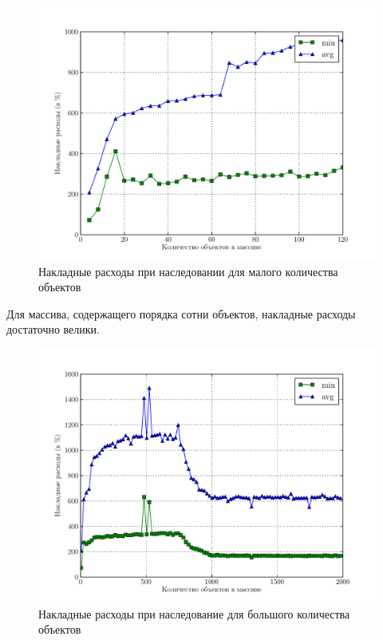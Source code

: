 \documentclass[12pt, a4paper, utf8]{article}
\begin{document}
\begin{figure}[H]
\centering
\includegraphics[width=\textwidth]{apps/compare_virtual_methods_l.pdf}
\caption[Накладные расходы при наследовании $\No$1]{Накладные расходы при наследовании для малого количества объектов}\label{fig:compare_virtual_methods_1}
\end{figure}

Для массива, содержащего порядка сотни объектов, накладные расходы достаточно велики.

\begin{figure}[H]
\centering
\includegraphics[width=\textwidth]{apps/compare_virtual_methods_b.pdf}
\caption[Накладные расходы при наследование $\No$2]{Накладные расходы при наследование для большого количества объектов}\label{fig:compare_virtual_methods_2}
\end{figure}
\end{document}
